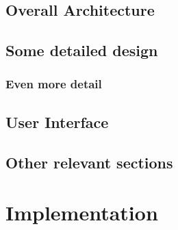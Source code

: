 

\subsection{Overall Architecture}

\subsection{Some detailed design}

\subsubsection{Even more detail}

\subsection{User Interface}

\subsection{Other relevant sections}

\section{Implementation}

% 
% 
% 

